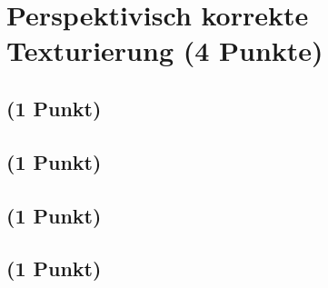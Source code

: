 \documentclass[a4paper,10pt,DIV=14]{article}
\begin{document}
\section{Perspektivisch korrekte Texturierung (4 Punkte)}

\subsection{(1 Punkt)}

\subsection{(1 Punkt)} 

\subsection{(1 Punkt)}

\subsection{(1 Punkt)}
\end{document}

